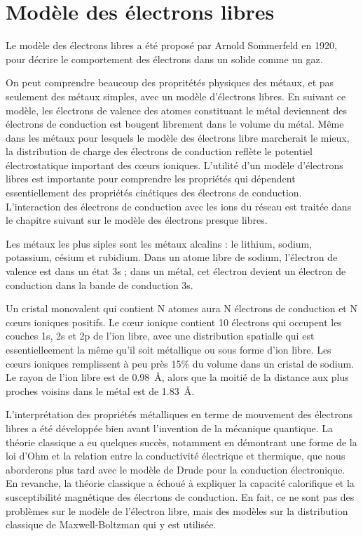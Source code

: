 \chapter{Modèle des électrons libres}

Le modèle des électrons libres a été proposé par Arnold Sommerfeld en 1920, pour
décrire le comportement des électrons dans un solide comme un gaz.

On peut comprendre beaucoup des propritétés physiques des métaux, et pas
seulement des métaux simples, avec un modèle d'électrons libres. En suivant ce
modèle, les électrons de valence des atomes constituant le métal deviennent des
électrons de conduction est bougent librement dans le volume du métal. Même dans
les métaux pour lesquels le modèle des électrons libre marcherait le mieux, la
distribution de charge des électrons de conduction reflète le potentiel 
électrostatique important des cœurs ioniques. L'utilité d'un modèle d'électrons
libres est importante pour comprendre les propriétés qui dépendent
essentiellement des propriétés cinétiques des électrons de conduction.
L'interaction des électrons de conduction avec les ions du réseau est traitée
dans le chapitre suivant sur le modèle des électrons presque libres.

Les métaux les plus siples sont les métaux alcalins : le lithium, sodium, 
potassium, césium et rubidium. Dans un atome libre de sodium, l'électron de 
valence est dans un état 3s ; dans un métal, cet électron devient un électron de
conduction dans la bande de conduction 3s.

Un cristal monovalent qui contient N atomes aura N électrons de conduction et N
cœurs ioniques positifs. Le cœur ionique  contient 10 électrons qui
occupent les couches 1s, 2s et 2p de l'ion libre, avec une distribution spatialle
qui est essentielleement la même qu'il soit métallique ou sous forme d'ion libre.
Les cœurs ioniques remplissent à peu près 15\% du volume dans un cristal de
sodium. Le rayon de l'ion libre  est de \SI{0.98}{\angstrom}, alors que
la moitié de la distance aux plus proches voisins dans le métal est de
\SI{1.83}{\angstrom}.

L'interprétation des propriétés métalliques en terme de mouvement des électrons
libres a été développée bien avant l'invention de la mécanique quantique. La 
théorie classique a eu quelques succès, notamment en démontrant une forme de la
loi d'Ohm et la relation entre la conductivité électrique et thermique, que nous
aborderons plus tard avec le modèle de Drude pour la conduction électronique.
En revanche, la théorie classique a échoué à  expliquer la capacité calorifique
et la susceptibilité magnétique des élecrtons de conduction. En fait, ce ne sont
pas des problèmes sur le modèle de l'électron libre, mais des modèles sur la
distribution classique de Maxwell-Boltzman qui y est utilisée.

